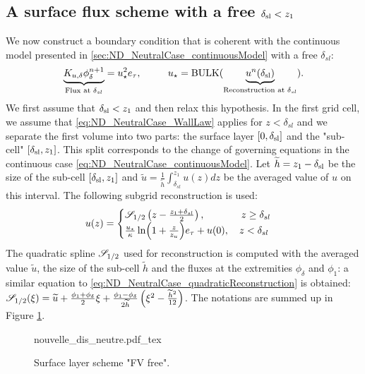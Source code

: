 \subsection{A surface flux scheme with a free $\delta_{\rm sl}<z_1$}
\label{sec:ND_NeutralCase_newSFscheme}
We now construct a boundary condition that is coherent
with the continuous model presented in
\ref{sec:ND_NeutralCase_continuousModel}
with a free $\delta_{sl}$:
\begin{equation}
	\label{eq:ND_NeutralCase_bottomCondFVFree}
	\underbrace{K_{u,\delta} \phi_{\delta}^{n+1}}_{\text{Flux at }
	\delta_{sl}}
		= u_\star^2 e_\tau, ~~~~~~~~
			  u_\star = {\rm BULK}(
			\underbrace{u^n(\delta_{\rm sl})}_{
				\text{Reconstruction at }
			\delta_{sl}}).
\end{equation}
We first assume
that $\delta_{\rm sl} < z_1$ and then relax this hypothesis.
In the first grid cell, we assume that
\eqref{eq:ND_NeutralCase_WallLaw} applies for $z<\delta_{sl}$
and we separate the 
first volume into two parts: the surface layer $[0,\delta_{\rm sl}]$ and the "sub-cell" $[\delta_{\rm sl}, z_1]$.
This split corresponds to the change of governing equations
in the continuous case \eqref{eq:ND_NeutralCase_continuousModel}.
Let $\widetilde{h} = z_1 - \delta_{\rm sl}$  be the size of the sub-cell $[\delta_{\rm sl}, z_1]$
and $\widetilde{u} = \frac{1}{\widetilde{h}}\int_{\delta_{sl}}^{z_1}
u(z)dz$ be the averaged value of $u$ on this interval.
The following subgrid reconstruction is used:
\begin{equation}
	\label{eq:ND_NeutralCase_fullReconstruction}
	u(z) = \begin{cases}
		{\cal S}_{1/2}\left(z - \frac{z_1 +
				\delta_{sl}}{2}\right),
		~~~~~~~~~~~ z \geq \delta_{sl}
		\\
		\frac{{u_\star}}{\kappa}
		\ln(1+\frac{z}{z_{u}})e_\tau + u(0),
		~~~ z < \delta_{sl}
	\end{cases}
\end{equation}
The quadratic spline ${\cal S}_{1/2}$ used for reconstruction
is computed with the averaged value $\widetilde{u}$, the
size of the sub-cell $\widetilde{h}$ and the fluxes at the
extremities $\phi_{\delta}$ and $\phi_1$:
a similar equation to
\eqref{eq:ND_NeutralCase_quadraticReconstruction}
is obtained:
${\cal S}_{1/2}(\xi) = 
\widetilde{u} + \frac{\phi_{1} + \phi_{\delta}}{2} \xi
+ \frac{\phi_{1} - \phi_{\delta}}{2\widetilde{h}}
\left(\xi^2 - \frac{\widetilde{h}^2}{12}\right)$.
The notations are summed up in Figure
\ref{fig:ND_NeutralCase_nouvelle_dis_neutre}.
\begin{figure}
	{nouvelle_dis_neutre.pdf_tex}
	\caption{ Surface layer scheme "FV free".}
	\label{fig:ND_NeutralCase_nouvelle_dis_neutre}
\end{figure}
